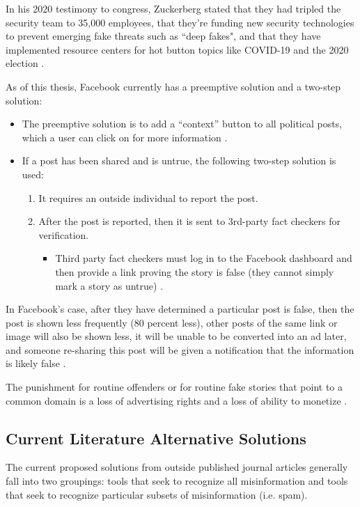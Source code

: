 \documentclass[preprint,review,12pt]{elsarticle}
\begin{document}
In his 2020 testimony to congress, Zuckerberg stated that they had tripled the security team to 35,000 employees, that they're funding new security technologies to prevent emerging fake threats such as ``deep fakes", and that they have implemented resource centers for hot button topics like COVID-19 and the 2020 election \cite{zuckerberg2020}.


As of this thesis, Facebook currently has a preemptive solution and a two-step solution:
\renewcommand{\labelenumii}{\Roman{enumii}}
\begin{itemize}
\item The preemptive solution is to add a “context” button to all political posts, which a user can click on for more information \cite{smith2018designing}.
 \item If a post has been shared and is untrue, the following two-step solution is used:
 \begin{enumerate}
     \item It requires an outside individual to report the post. 
     \item After the post is reported, then it is  sent to 3rd-party fact checkers for verification. 
     \begin{itemize}
     \item Third party fact checkers must log in to the Facebook dashboard and then provide a link proving the story is false (they cannot simply mark a story as untrue) \cite{owen2016clamping}.
     \end{itemize}
 \end{enumerate}
 \end{itemize}
 
 In Facebook’s case, after they have determined a particular post is false, then the post is shown less frequently (80 percent less), other posts of the same link or image will also be shown less, it will be unable to be converted into an ad later, and someone re-sharing this post will be given a notification that the information is likely false \cite{owen2016clamping,facebook2020fact}.
 
 The punishment for routine offenders or for routine fake stories that point to a common domain is a loss of advertising rights and a loss of ability to monetize \cite{facebook2020fact}.
 
 \subsection{Current Literature Alternative Solutions}
 \label{sec: literature review}
 The current proposed solutions from outside published journal articles generally fall into two groupings: tools that seek to recognize all misinformation and tools that seek to recognize particular subsets of misinformation (i.e. spam).
\end{document}
